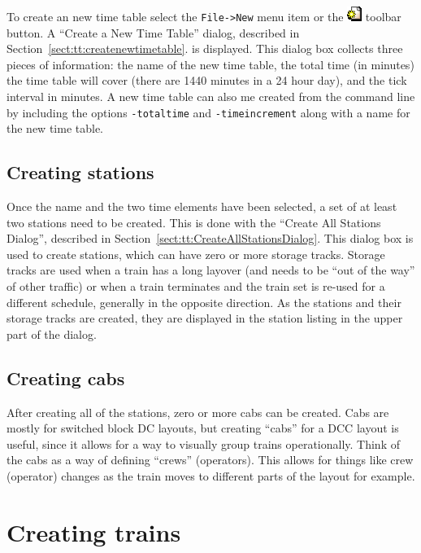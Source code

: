 To create an new time table select the \verb=File->New= menu item or
the \includegraphics{TTNewTool.png} toolbar button. A ``Create a New
Time Table'' dialog, described in
Section~\ref{sect:tt:createnewtimetable}. is displayed.  This dialog
box collects three pieces of information: the name of the new time
table, the total time (in minutes) the time table will cover (there are
1440 minutes in a 24 hour day), and the tick interval in minutes.  A
new time table can also me created from the command line by including
the options \verb=-totaltime= and \verb=-timeincrement= along with a
name for the new time table.

\subsection{Creating stations}

Once the name and the two time elements have been selected, a set of at
least two stations need to be created.  This is done with the ``Create
All Stations Dialog'',  described in
Section~\ref{sect:tt:CreateAllStationsDialog}.  This dialog box is
used to create stations, which can have zero or more storage tracks. 
Storage tracks are used when a train has a long layover (and needs to
be ``out of the way'' of other traffic) or when a train terminates and
the train set is re-used for a different schedule, generally in the
opposite direction. As the stations and their storage tracks are
created, they are displayed in the station listing in the upper part of
the dialog. 

\subsection{Creating cabs}

After creating all of the stations, zero or more cabs can be created. 
Cabs are mostly for switched block DC layouts, but creating ``cabs''
for a DCC layout is useful, since it allows for a way to visually group
trains operationally. Think of the cabs as a way of defining ``crews''
(operators).  This allows for things like crew (operator) changes as
the train moves to different parts of the layout for example.

\section{Creating trains}

